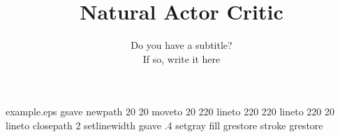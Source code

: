 %
%
%
%
%
\begin{filecontents*}{example.eps}
gsave
newpath
  20 20 moveto
  20 220 lineto
  220 220 lineto
  220 20 lineto
closepath
2 setlinewidth
gsave
  .4 setgray fill
grestore
stroke
grestore
\end{filecontents*}
%
\RequirePackage{fix-cm}
%
\documentclass[smallextended]{svjour3}       %
%
\smartqed  %
%
\usepackage{graphicx}

%
%

\usepackage{natbib} %
\usepackage{amsmath}
\usepackage{algorithm}
\usepackage{algorithmic}



%
%

\title{Natural Actor Critic
}
\subtitle{Do you have a subtitle?\\ If so, write it here}


